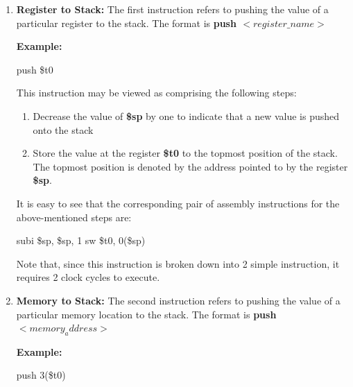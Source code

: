 \documentclass{article}
\begin{document}
		\begin{enumerate}
			
			
			\item  \textbf{Register to Stack: } The first instruction refers to pushing the value of a particular register to the stack. The format is \textbf{push \hspace{.5mm} $<register\_name>$}
			
			\textbf{Example:} 
			
				push \$t0
			
			This instruction may be viewed as comprising the following steps:
			
			\begin{enumerate}
				\item Decrease the value of \textbf{\$sp} by one to indicate that a new value is pushed onto the stack
				
				\item Store the value at the register \textbf{\$t0} to the topmost position of the stack. The topmost position is denoted by the address pointed to by the register \textbf{\$sp}.
				
			\end{enumerate}
			
			It is easy to see that the corresponding pair of assembly instructions for the above-mentioned steps are:
			
				subi \$sp, \$sp, 1
				sw \$t0, 0(\$sp) 
			
			Note that, since this instruction is broken down into 2 simple instruction, it requires 2 clock cycles to execute.
			
			\vspace{3mm}
			
			\item  \textbf{Memory to Stack: } The second instruction refers to pushing the value of a particular memory location to the stack. The format is \textbf{push \hspace{.5mm} $<memory_address>$}
			
			\textbf{Example:} 
			
				push 3(\$t0)
			

\end{enumerate}
\end{document}
